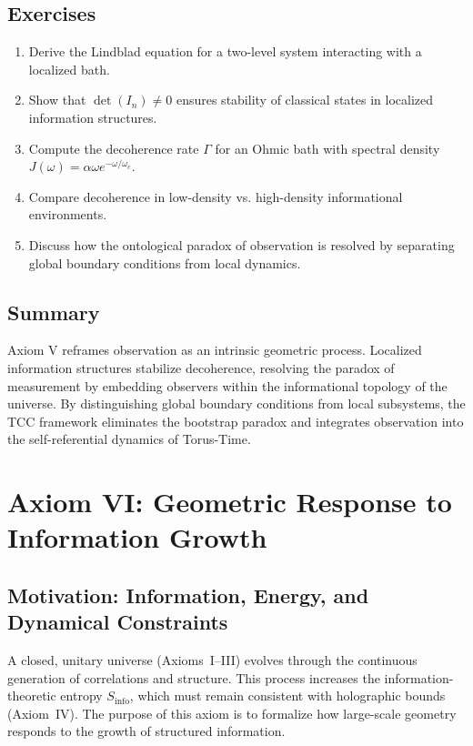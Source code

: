 \documentclass[12pt,openany]{book}
\theoremstyle{plain}
\theoremstyle{definition}
\theoremstyle{remark}
\begin{document}
\section{Exercises}
\begin{enumerate}
    \item Derive the Lindblad equation for a two-level system interacting with a localized bath.
    \item Show that $\det(I_n) \neq 0$ ensures stability of classical states in localized information structures.
    \item Compute the decoherence rate $\Gamma$ for an Ohmic bath 
          with spectral density $J(\omega) = \alpha \omega e^{-\omega/\omega_c}$.
    \item Compare decoherence in low-density vs. high-density informational environments.
    \item Discuss how the ontological paradox of observation is resolved by separating global boundary conditions from local dynamics.
\end{enumerate}

\section{Summary}
Axiom V reframes observation as an intrinsic geometric process. 
Localized information structures stabilize decoherence, resolving 
the paradox of measurement by embedding observers within the 
informational topology of the universe. By distinguishing global 
boundary conditions from local subsystems, the TCC framework 
eliminates the bootstrap paradox and integrates observation into 
the self-referential dynamics of Torus-Time.

\chapter{Axiom VI: Geometric Response to Information Growth}

\section{Motivation: Information, Energy, and Dynamical Constraints}

A closed, unitary universe (Axioms~I--III) evolves through the continuous
generation of correlations and structure. This process increases the
information-theoretic entropy $S_{\mathrm{info}}$, which must remain consistent
with holographic bounds (Axiom~IV). The purpose of this axiom is to formalize
how large-scale geometry responds to the growth of structured information.
\end{document}

